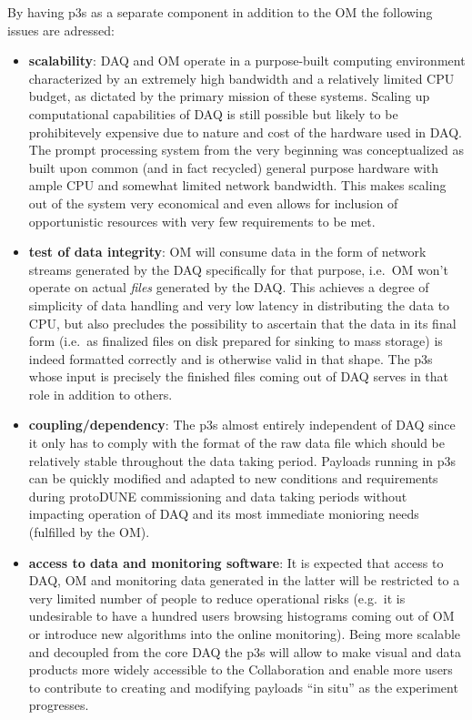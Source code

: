 \documentclass[pdftex,12pt,letter]{article}
\newcommand{\pd}{protoDUNE\xspace}
\begin{document}
By having p3s as a separate
component in addition to the OM the following issues are adressed:
\begin{itemize}

\item \textbf{scalability}: DAQ and OM operate in a purpose-built computing environment characterized
by an extremely high bandwidth and a relatively limited CPU budget, as dictated by the
primary mission of these systems. Scaling up computational capabilities of DAQ
is still possible but likely to be prohibitevely expensive due to nature and cost of
the hardware used in DAQ. The prompt processing system from the very beginning
was conceptualized as built upon common (and in fact recycled) general purpose hardware
with ample CPU and somewhat limited network bandwidth. This makes scaling out of
the system very economical and even allows for inclusion of opportunistic resources
with very few requirements to be met.

\item \textbf{test of data integrity}: OM will consume data in the form of network streams generated
by the DAQ specifically for that purpose, i.e.~OM won't operate on actual \textit{files} generated
by the DAQ. This achieves a degree of simplicity of data handling and very low latency
in distributing the data to CPU, but also precludes the possibility to ascertain that the data
in its final form (i.e.~as finalized files on disk prepared for sinking to mass storage) is indeed
formatted correctly and is otherwise valid in that shape. The p3s whose input is precisely the finished
files coming out of DAQ serves in that role in addition to others.

\item \textbf{coupling/dependency}: 
The p3s almost entirely independent of DAQ since it only has to comply with the format
of the raw data file which should be relatively stable
throughout the data taking period. Payloads running in p3s can be quickly modified
and adapted to new conditions and requirements during \pd commissioning and
data taking periods without impacting operation of DAQ and its most immediate
monioring needs (fulfilled by the OM).

\item \textbf{access to data and monitoring software}:
It is expected that access to DAQ, OM and monitoring data generated in the latter will be
restricted to a very limited number of people to reduce operational risks 
(e.g.~it is undesirable to have a hundred users browsing histograms coming out of OM
or introduce new algorithms into the online monitoring). Being more scalable and 
decoupled from the core DAQ the p3s will allow to make visual and data products
more widely accessible to the Collaboration and enable more users to contribute
to creating and modifying payloads ``in situ'' as the experiment progresses.


\end{itemize}
\end{document}

